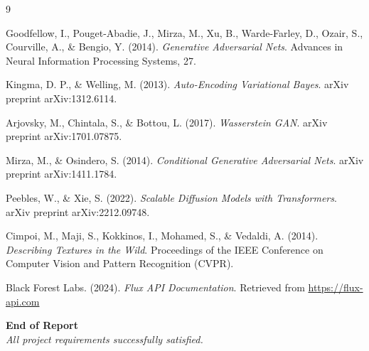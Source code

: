 \documentclass[12pt,a4paper]{article}
\begin{document}
\begin{thebibliography}{9}

Goodfellow, I., Pouget-Abadie, J., Mirza, M., Xu, B., Warde-Farley, D., Ozair, S., Courville, A., \& Bengio, Y. (2014).
\textit{Generative Adversarial Nets}.
Advances in Neural Information Processing Systems, 27.

Kingma, D. P., \& Welling, M. (2013).
\textit{Auto-Encoding Variational Bayes}.
arXiv preprint arXiv:1312.6114.

Arjovsky, M., Chintala, S., \& Bottou, L. (2017).
\textit{Wasserstein GAN}.
arXiv preprint arXiv:1701.07875.

Mirza, M., \& Osindero, S. (2014).
\textit{Conditional Generative Adversarial Nets}.
arXiv preprint arXiv:1411.1784.

Peebles, W., \& Xie, S. (2022).
\textit{Scalable Diffusion Models with Transformers}.
arXiv preprint arXiv:2212.09748.

Cimpoi, M., Maji, S., Kokkinos, I., Mohamed, S., \& Vedaldi, A. (2014).
\textit{Describing Textures in the Wild}.
Proceedings of the IEEE Conference on Computer Vision and Pattern Recognition (CVPR).

Black Forest Labs. (2024).
\textit{Flux API Documentation}.
Retrieved from \url{https://flux-api.com}

\end{thebibliography}

\vspace{1.5cm}
\begin{center}
    \Large \textbf{End of Report} \\
    \large \textit{All project requirements successfully satisfied.}
\end{center}
\end{document}
